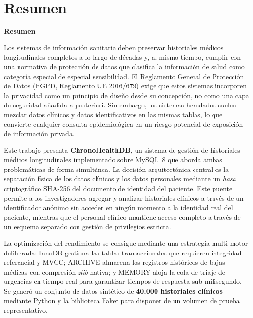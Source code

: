\documentclass[../main.tex]{subfiles}
\begin{document}
\makeatletter
\renewenvironment{abstract}{%
    \if@twocolumn
      \section*{Resumen \\}%
    \else
    \begin{flushright}
        {\filleft\Huge\bfseries\fontsize{48pt}{12}\selectfont Resumen\vspace{\z@}}%
        \end{flushright}
      \quotation
    \fi}
    {\if@twocolumn\else\endquotation\fi}
\makeatother

\begin{abstract}

Los sistemas de información sanitaria deben preservar historiales médicos longitudinales completos a lo largo de décadas y, al mismo tiempo, cumplir con una normativa de protección de datos que clasifica la información de salud como categoría especial de especial sensibilidad. El Reglamento General de Protección de Datos (RGPD, Reglamento UE 2016/679) exige que estos sistemas incorporen la privacidad como un principio de diseño desde su concepción, no como una capa de seguridad añadida a posteriori. Sin embargo, los sistemas heredados suelen mezclar datos clínicos y datos identificativos en las mismas tablas, lo que convierte cualquier consulta epidemiológica en un riesgo potencial de exposición de información privada.

Este trabajo presenta \textbf{ChronoHealthDB}, un sistema de gestión de historiales médicos longitudinales implementado sobre MySQL~8 que aborda ambas problemáticas de forma simultánea. La decisión arquitectónica central es la separación física de los datos clínicos y los datos personales mediante un \textit{hash} criptográfico SHA-256 del documento de identidad del paciente. Este puente permite a los investigadores agregar y analizar historiales clínicos a través de un identificador anónimo sin acceder en ningún momento a la identidad real del paciente, mientras que el personal clínico mantiene acceso completo a través de un esquema separado con gestión de privilegios estricta.

La optimización del rendimiento se consigue mediante una estrategia multi-motor deliberada: InnoDB gestiona las tablas transaccionales que requieren integridad referencial y MVCC; ARCHIVE almacena los registros históricos de bajas médicas con compresión \textit{zlib} nativa; y MEMORY aloja la cola de triaje de urgencias en tiempo real para garantizar tiempos de respuesta sub-milisegundo. Se generó un conjunto de datos sintético de \textbf{40.000 historiales clínicos} mediante Python y la biblioteca Faker para disponer de un volumen de prueba representativo.


\end{abstract}
\end{document}
